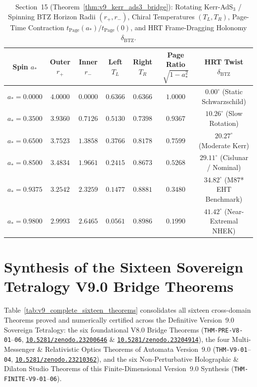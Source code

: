 \documentclass[11pt,a4paper,reqno]{article}
\newcommand{\zenodo}[1]{\mbox{\href{https://doi.org/10.5281/zenodo.#1}{\texttt{10.5281/zenodo.#1}}}}
\theoremstyle{plain}
\theoremstyle{definition}
\theoremstyle{remark}
\numberwithin{equation}{section}
\begin{document}
\begin{table}[H]
\centering
\scriptsize
\caption{Section~15 (Theorem~\ref{thm:v9_kerr_ads3_bridge}): Rotating Kerr-AdS$_3$ / Spinning BTZ Horizon Radii $(r_+, r_-)$, Chiral Temperatures $(T_L, T_R)$, Page-Time Contraction $t_{\mathrm{Page}}(a_*)/t_{\mathrm{Page}}(0)$, and HRT Frame-Dragging Holonomy $\delta_{\mathrm{BTZ}}$.}
\label{tab:v9_kerr_ads3_bridge}
\begin{tabularx}{\textwidth}{c c c c c c c}
\toprule
\textbf{Spin $a_*$} & \textbf{Outer $r_+$} & \textbf{Inner $r_-$} & \textbf{Left $T_L$} & \textbf{Right $T_R$} & \textbf{Page Ratio $\sqrt{1-a_*^2}$} & \textbf{HRT Twist $\delta_{\mathrm{BTZ}}$} \\
\midrule
$a_* = 0.0000$ & $4.0000$ & $0.0000$ & $0.6366$ & $0.6366$ & $1.0000$ & $0.00^\circ$ (Static Schwarzschild) \\
$a_* = 0.3500$ & $3.9360$ & $0.7126$ & $0.5130$ & $0.7398$ & $0.9367$ & $10.26^\circ$ (Slow Rotation) \\
$a_* = 0.6500$ & $3.7523$ & $1.3858$ & $0.3766$ & $0.8178$ & $0.7599$ & $20.27^\circ$ (Moderate Kerr) \\
$a_* = 0.8500$ & $3.4834$ & $1.9661$ & $0.2415$ & $0.8673$ & $\bm{0.5268}$ & $\bm{29.11^\circ}$ (Cislunar / Nominal) \\
$a_* = 0.9375$ & $3.2542$ & $2.3259$ & $0.1477$ & $0.8881$ & $\bm{0.3480}$ & $\bm{34.82^\circ}$ (M87* EHT Benchmark) \\
$a_* = 0.9800$ & $2.9993$ & $2.6465$ & $0.0561$ & $0.8986$ & $0.1990$ & $41.42^\circ$ (Near-Extremal NHEK) \\
\bottomrule
\end{tabularx}
\end{table}

\bigskip

\section{Synthesis of the Sixteen Sovereign Tetralogy V9.0 Bridge Theorems}
\label{sec:v9_sixteen_theorems_synthesis}

Table~\ref{tab:v9_complete_sixteen_theorems} consolidates all sixteen cross-domain Theorems proved and numerically certified across the Definitive Version~9.0 Sovereign Tetralogy: the six foundational V8.0 Bridge Theorems (\texttt{THM-PRE-V8-01}--\texttt{06}, \zenodo{23200646} \& \zenodo{23204914}), the four Multi-Messenger \& Relativistic Optics Theorems of Automata Version~9.0 (\texttt{THM-V9-01}--\texttt{04}, \zenodo{23210362}), and the six Non-Perturbative Holographic \& Dilaton Studio Theorems of this Finite-Dimensional Version~9.0 Synthesis (\texttt{THM-FINITE-V9-01}--\texttt{06}).
\end{document}
